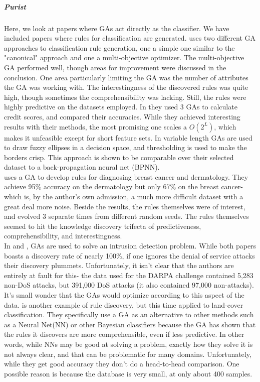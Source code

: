 \subparagraph{Purist}
Here, we look at papers where GAs act directly as the classifier.  We have included papers where rules for classification are generated.  \cite{dehuri_application_2008} uses two different GA approaches to classification rule generation, one a simple one similar to the "canonical" approach and one a multi-objective optimizer.  The multi-objective GA performed well, though areas for improvement were discussed in the conclusion.  One area particularly limiting the GA was the number of attributes the GA was working with.  The interestingness of the discovered rules was quite high, though sometimes the comprehensibility was lacking.  Still, the rules were highly predictive on the datasets employed.
In \cite{kozeny_genetic_2015} they used 3 GAs to calculate credit scores, and compared their accuracies.  While they achieved interesting results with their methods, the most promising one scales a $O(2^L)$, which makes it unfeasible except for short feature sets.  In \cite{srikanth_variable-length_1995} variable length GAs are used to draw fuzzy ellipses in a decision space, and thresholding is used to make the borders crisp.  This approach is shown to be comparable over their selected dataset to a back-propagation neural net (BPNN).\\
\cite{fidelis_discovering_2000} uses a GA to develop rules for diagnosing breast cancer and dermatology.  They achieve 95\% accuracy on the dermatology but only 67\% on the breast cancer- which is, by the author's own admission, a much more difficult dataset with a great deal more noise.  Beside the results, the rules themselves were of interest, and evolved 3 separate times from different random seeds.   The rules themselves seemed to hit the knowledge discovery trifecta of predictiveness, comprehensibility, and interestingness.\\
In \cite{hoque_implementation_2012} and \cite{li_application_2012}, GAs are used to solve an intrusion detection problem.  While both papers boasts a discovery rate of nearly 100\%, if one ignores the denial of service attacks their discovery plummets.  Unfortunately, it isn't clear that the authors are entirely at fault for this- the data used for the DARPA challenge contained 5,283 non-DoS attacks, but 391,000 DoS attacks (it also contained 97,000 non-attacks).  It’s small wonder that the GAs would optimize according to this aspect of the data.
\cite{tseng_genetic_2008} is another example of rule discovery, but this time applied to land-cover classification.  They specifically use a GA as an alternative to other methods such as a Neural Net(NN) or other Bayesian classifiers because the GA has shown that the rules it discovers are more comprehensible, even if less predictive.  In other words, while NNs may be good at solving a problem, exactly how they solve it is not always clear, and that can be problematic for many domains.  Unfortunately, while they get good accuracy they don't do a head-to-head comparison.  One possible reason is because the database is very small, at only about 400 samples.\\
